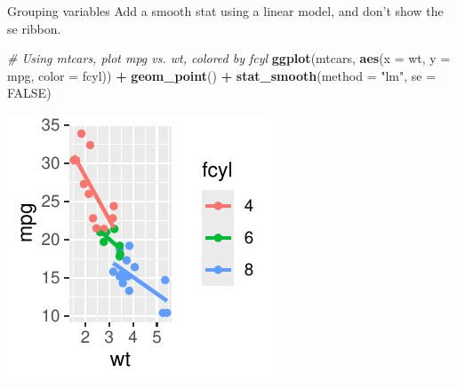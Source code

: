 \documentclass[
  ignorenonframetext,
]{beamer}
\newenvironment{Shaded}{\begin{snugshade}}{\end{snugshade}}
\newcommand{\AttributeTok}[1]{\textcolor[rgb]{0.13,0.29,0.53}{#1}}
\newcommand{\CommentTok}[1]{\textcolor[rgb]{0.56,0.35,0.01}{\textit{#1}}}
\newcommand{\ConstantTok}[1]{\textcolor[rgb]{0.56,0.35,0.01}{#1}}
\newcommand{\FunctionTok}[1]{\textcolor[rgb]{0.13,0.29,0.53}{\textbf{#1}}}
\newcommand{\NormalTok}[1]{#1}
\newcommand{\SpecialCharTok}[1]{\textcolor[rgb]{0.81,0.36,0.00}{\textbf{#1}}}
\newcommand{\StringTok}[1]{\textcolor[rgb]{0.31,0.60,0.02}{#1}}
\begin{document}
\begin{frame}[fragile]{Grouping variables}
\label{grouping-variables-3}
Add a smooth stat using a linear model, and don't show the se ribbon.


\begin{Shaded}
\begin{Highlighting}[]
\CommentTok{\# Using mtcars, plot mpg vs. wt, colored by fcyl}
\FunctionTok{ggplot}\NormalTok{(mtcars, }\FunctionTok{aes}\NormalTok{(}\AttributeTok{x =}\NormalTok{ wt, }\AttributeTok{y =}\NormalTok{ mpg, }\AttributeTok{color =}\NormalTok{ fcyl)) }\SpecialCharTok{+} \FunctionTok{geom\_point}\NormalTok{() }\SpecialCharTok{+}
    \FunctionTok{stat\_smooth}\NormalTok{(}\AttributeTok{method =} \StringTok{"lm"}\NormalTok{, }\AttributeTok{se =} \ConstantTok{FALSE}\NormalTok{)}
\end{Highlighting}
\end{Shaded}

\begin{center}\includegraphics[width=0.5\linewidth]{Figs/unnamed-chunk-8-1} \end{center}
\end{frame}
\end{document}
